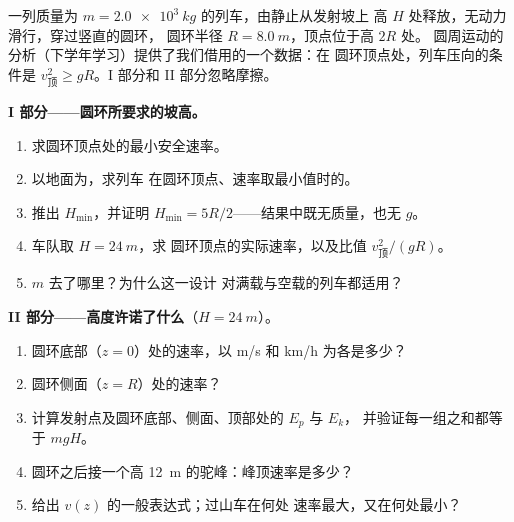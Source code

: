 \begin{problem}
\label{pb:g11:mechanical-energy:1}
一列质量为 $m = \qty{2.0e3}{kg}$ 的列车，由静止从发射坡上
高 $H$ 处释放，无动力滑行，穿过竖直的圆环，
圆环半径 $R = \qty{8.0}{m}$，顶点位于高 $2R$ 处。
圆周运动的分析（下学年学习）提供了我们借用的一个数据：在
圆环顶点处，列车压向的条件是
$v_{\text{顶}}^2 \geq gR$。I 部分和 II 部分忽略摩擦。

\medskip
\noindent\textbf{I 部分——圆环所要求的坡高。}
\begin{enumerate}
  \item 求圆环顶点处的最小安全速率。
  \item 以地面为，求列车
        在圆环顶点、速率取最小值时的。
  \item 推出 $H_{\min}$，并证明 $H_{\min} = 5R/2$——结果中既无质量，也无 $g$。
  \item 车队取 $H = \qty{24}{m}$，求
        圆环顶点的实际速率，以及比值 $v_{\text{顶}}^2/(gR)$。
  \item $m$ 去了哪里？为什么这一设计
        对满载与空载的列车都适用？
\end{enumerate}

\medskip
\noindent\textbf{II 部分——高度许诺了什么}（$H = \qty{24}{m}$）。
\begin{enumerate}[resume]
  \item 圆环底部（$z = 0$）处的速率，以 \unit{m/s} 和
        \unit{km/h} 为各是多少？
  \item 圆环侧面（$z = R$）处的速率？
  \item 计算发射点及圆环底部、侧面、顶部处的 $E_p$ 与 $E_k$，
        并验证每一组之和都等于 $mgH$。
  \item 圆环之后接一个高 \qty{12}{m} 的驼峰：峰顶速率是多少？
  \item 给出 $v(z)$ 的一般表达式；过山车在何处
        速率最大，又在何处最小？
\end{enumerate}


\end{problem}
